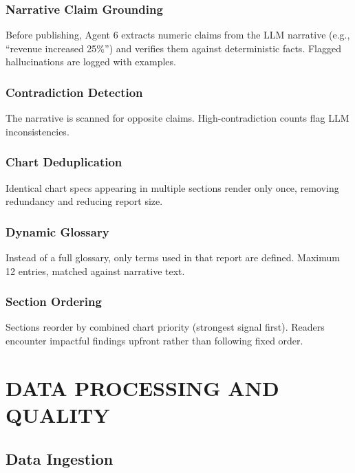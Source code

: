 \subsection{Narrative Claim Grounding}

Before publishing, Agent 6 extracts numeric claims from the LLM narrative (e.g., ``revenue increased 25\%'') and verifies them against deterministic facts. Flagged hallucinations are logged with examples.

\subsection{Contradiction Detection}

The narrative is scanned for opposite claims. High-contradiction counts flag LLM inconsistencies.

\subsection{Chart Deduplication}

Identical chart specs appearing in multiple sections render only once, removing redundancy and reducing report size.

\subsection{Dynamic Glossary}

Instead of a full glossary, only terms used in that report are defined. Maximum 12 entries, matched against narrative text.

\subsection{Section Ordering}

Sections reorder by combined chart priority (strongest signal first). Readers encounter impactful findings upfront rather than following fixed order.

\chapter{DATA PROCESSING AND QUALITY}
\label{ch:processing}

\section{Data Ingestion}


